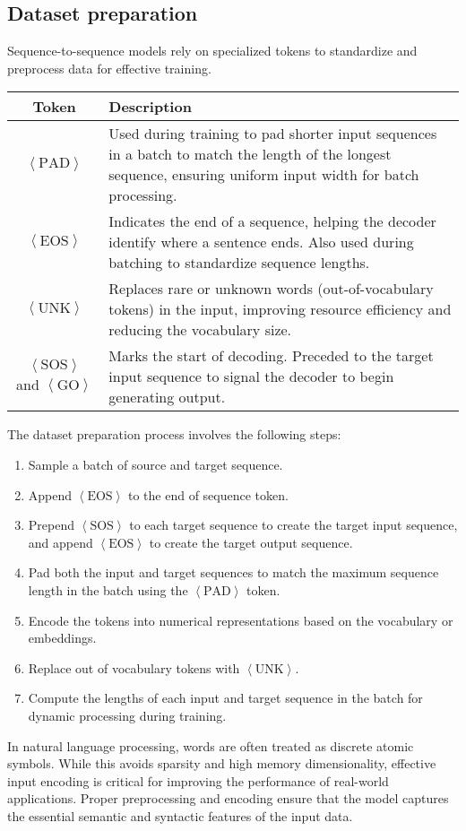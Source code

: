 \subsection{Dataset preparation}
Sequence-to-sequence models rely on specialized tokens to standardize and preprocess data for effective training. 
\begin{table}[H]
    \centering
    \begin{tabular}{|c|p{10cm}|}
    \hline
    \textbf{Token} & \textbf{Description} \\ \hline
    $\left\langle \text{PAD}\right\rangle $ & Used during training to pad shorter input sequences in a batch to match the length of the longest sequence, ensuring uniform input width for batch processing. \\ \hline
    $\left\langle \text{EOS}\right\rangle $ & Indicates the end of a sequence, helping the decoder identify where a sentence ends. Also used during batching to standardize sequence lengths. \\ \hline
    $\left\langle \text{UNK}\right\rangle $ & Replaces rare or unknown words (out-of-vocabulary tokens) in the input, improving resource efficiency and reducing the vocabulary size. \\ \hline
    $\left\langle \text{SOS}\right\rangle $ and $\left\langle \text{GO}\right\rangle$ & Marks the start of decoding. Preceded to the target input sequence to signal the decoder to begin generating output. \\ \hline
    \end{tabular}
\end{table}
The dataset preparation process involves the following steps:
\begin{enumerate}
    \item Sample a batch of source and target sequence. 
    \item Append $\left\langle \text{EOS}\right\rangle$ to the end of sequence token. 
    \item Prepend $\left\langle \text{SOS}\right\rangle $ to each target sequence to create the target input sequence, and append $\left\langle\text{EOS}\right\rangle$ to create the target output sequence.
    \item Pad both the input and target sequences to match the maximum sequence length in the batch using the $\left\langle \text{PAD}\right\rangle$ token.
    \item Encode the tokens into numerical representations based on the vocabulary or embeddings.
    \item Replace out of vocabulary tokens with $\left\langle \text{UNK}\right\rangle $.
    \item Compute the lengths of each input and target sequence in the batch for dynamic processing during training.
\end{enumerate}
In natural language processing, words are often treated as discrete atomic symbols. 
While this avoids sparsity and high memory dimensionality, effective input encoding is critical for improving the performance of real-world applications. 
Proper preprocessing and encoding ensure that the model captures the essential semantic and syntactic features of the input data.

